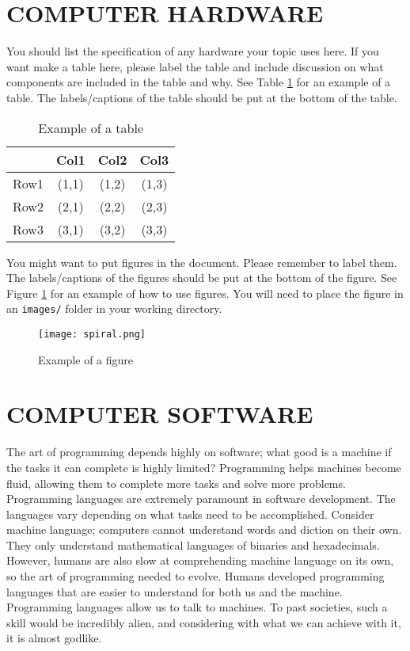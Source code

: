\documentclass[letterpaper, 10 pt, conference]{IEEEconf}
\begin{document}
\section{COMPUTER HARDWARE}

You should list the specification of any hardware your topic
uses here. If you want make a table here, please label the table
and include discussion on what components are included in the
table and why. See Table
\ref{tbl:example} for an example of a table.
The labels/captions of the table should be put at the bottom
of the table.


\begin{table}[h!]
\begin{center}
\begin{tabular}{||c | c | c | c||} 
\hline
  & Col1 & Col2 & Col3 \\ [0.5ex]
\hline\hline
Row1 & (1,1) & (1,2) & (1,3) \\ 
\hline
Row2 & (2,1) & (2,2) & (2,3) \\
\hline
Row3 & (3,1) & (3,2) & (3,3) \\
\hline
\end{tabular}
\caption{Example of a table}
\label{tbl:example}
\end{center}
\end{table}

You might want to put figures in the document. Please
remember to label them. The labels/captions of the figures
should be put at the bottom of the figure. See Figure
\ref{fig:example} for an example of how to use figures.
You will need to place the figure in an \texttt{images/} folder
in your working directory.

\begin{figure}[h!]
\centering
\texttt{[image: spiral.png]}
\caption{Example of a figure}
\label{fig:example}
\end{figure} 

\section{COMPUTER SOFTWARE}

The art of programming depends highly on software; what good is a machine if the tasks it can complete is highly limited? Programming helps machines become fluid, allowing them to complete more tasks and solve more problems. Programming languages are extremely paramount in software development. The languages vary depending on what tasks need to be accomplished. Consider machine language; computers cannot understand words and diction on their own. They only understand mathematical languages of binaries and hexadecimals. However, humans are also slow at comprehending machine language on its own, so the art of programming needed to evolve. Humans developed programming languages that are easier to understand for both us and the machine. Programming languages allow us to talk to machines. To past societies, such a skill would be incredibly alien, and considering with what we can achieve with it, it is almost godlike. 
\end{document}
